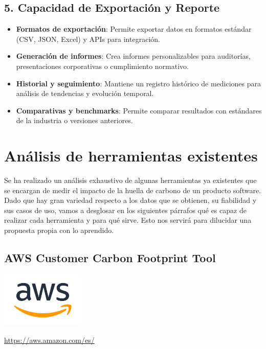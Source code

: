 \documentclass[12pt,a4paper]{report}
\begin{document}
\subsection*{5. Capacidad de Exportación y Reporte}
\begin{itemize}
  \item \textbf{Formatos de exportación}: Permite exportar datos en formatos estándar (CSV, JSON, Excel) y APIs para integración.
  \item \textbf{Generación de informes}: Crea informes personalizables para auditorías, presentaciones corporativas o cumplimiento normativo.
  \item \textbf{Historial y seguimiento}: Mantiene un registro histórico de mediciones para análisis de tendencias y evolución temporal.
  \item \textbf{Comparativas y benchmarks}: Permite comparar resultados con estándares de la industria o versiones anteriores.
\end{itemize}

\section{Análisis de herramientas existentes}

Se ha realizado un análisis exhaustivo de algunas herramientas ya existentes
que se encargan de medir el impacto de la huella de carbono de un producto
software. Dado que hay gran variedad respecto a los datos que se obtienen, su
fiabilidad y sus casos de uso, vamos a desglosar en los siguientes párrafos qué
es capaz de realizar cada herramienta y para qué sirve. Esto nos servirá para
dilucidar una propuesta propia con lo aprendido.

\subsection*{AWS Customer Carbon Footprint Tool}

\begin{center}
\includegraphics[width=0.3\textwidth]{imagenes/AWS_Logo.png}
\end{center}

\href{https://aws.amazon.com/es/}{https://aws.amazon.com/es/}
\end{document}
